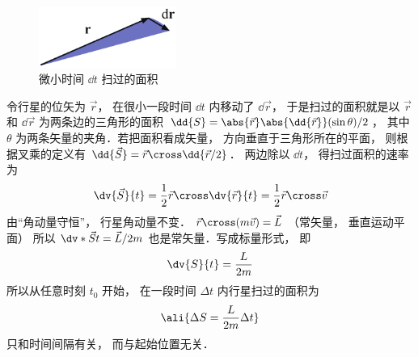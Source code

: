 
\begin{figure}[ht]
\centering
\includegraphics[width=4.5cm]{./figures/Keple21.pdf}
\caption{微小时间 $\dd{t}$ 扫过的面积} \label{Keple2_fig1}
\end{figure}

令行星的位矢为 $\vec r$，  在很小一段时间 $\dd{t}$ 内移动了 $\dd{\vec r}$，  于是扫过的面积就是以 $\vec r$ 和 $\dd{\vec r}$ 为两条边的三角形的面积 $\dd{S} = \abs{\vec r} \abs{\dd{\vec r}} (\sin \theta) /2 $，  其中 $\theta$ 为两条矢量的夹角．若把面积看成矢量， 方向垂直于三角形所在的平面， 则根据叉乘的定义有 $\dd{\vec S} = \vec r \cross \dd{\vec r/2}$． 两边除以 $\dd{t}$，  得扫过面积的速率为
\begin{equation}
\dv{\vec S}{t} = \frac12 \vec r \cross \dv{\vec r}{t} = \frac12 \vec r\cross \vec v
\end{equation}
由“角动量守恒”， 行星角动量不变．
$\vec r \cross (m\vec v) = \vec L$ （常矢量， 垂直运动平面） 所以 $\dv*{\vec S}{t} = \vec L /2m$ 也是常矢量．写成标量形式， 即
\begin{equation}
\dv{S}{t} = \frac{L}{2m}
\end{equation}
所以从任意时刻 $t_0$ 开始， 在一段时间 $\Delta t$ 内行星扫过的面积为 
\begin{equation}\ali{
\Delta S = \frac{L}{2m}\Delta t
}\end{equation}
只和时间间隔有关， 而与起始位置无关．

